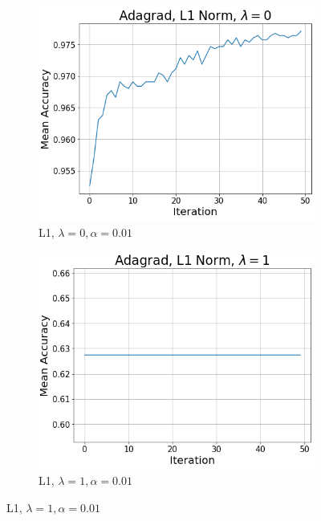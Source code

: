 \documentclass{article}
\begin{document}
\begin{enumerate}
\begin{figure}[h!]
     	\hfill
     	\begin{subfigure}[b]{0.3\textwidth}
         	\centering
         	\includegraphics[width=\textwidth]
         	{Problem_2_3/Adagrad_L1_1.png}
         	\caption{L1, $\lambda=0,\alpha=0.01$}
         	\label{fig:ADA_L1_1}
     	\end{subfigure}
     	\hfill
     	\begin{subfigure}[b]{0.3\textwidth}
         	\centering
         	\includegraphics[width=\textwidth]
         	{Problem_2_3/Adagrad_L1_2.png}
         	\caption{L1, $\lambda=1,\alpha=0.01$}
         	\label{fig:ADA_L1_2}
     	\end{subfigure}

\end{figure}
\end{enumerate}
\end{document}
